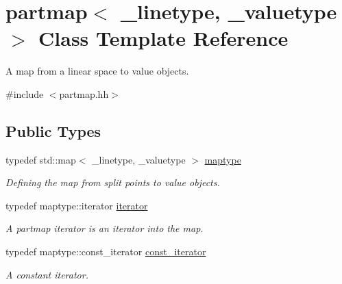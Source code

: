 \hypertarget{classpartmap}{}\section{partmap$<$ \+\_\+linetype, \+\_\+valuetype $>$ Class Template Reference}
\label{classpartmap}


A map from a linear space to value objects.  




{\ttfamily \#include $<$partmap.\+hh$>$}

\subsection*{Public Types}
\begin{DoxyCompactItemize}
\item 
typedef std\+::map$<$ \+\_\+linetype, \+\_\+valuetype $>$ \mbox{\hyperlink{classpartmap_abdafeca5ddc449596a7d188791b4702f}{maptype}}
\begin{DoxyCompactList}\small\item\em Defining the map from split points to value objects. \end{DoxyCompactList}\item 
typedef maptype\+::iterator \mbox{\hyperlink{classpartmap_a795a7501233dbf866b98a51585552d06}{iterator}}
\begin{DoxyCompactList}\small\item\em A partmap iterator is an iterator into the map. \end{DoxyCompactList}\item 
typedef maptype\+::const\+\_\+iterator \mbox{\hyperlink{classpartmap_a01c7ea382b2a493dbd4a4431a2c39520}{const\+\_\+iterator}}
\begin{DoxyCompactList}\small\item\em A constant iterator. \end{DoxyCompactList}\end{DoxyCompactItemize}
